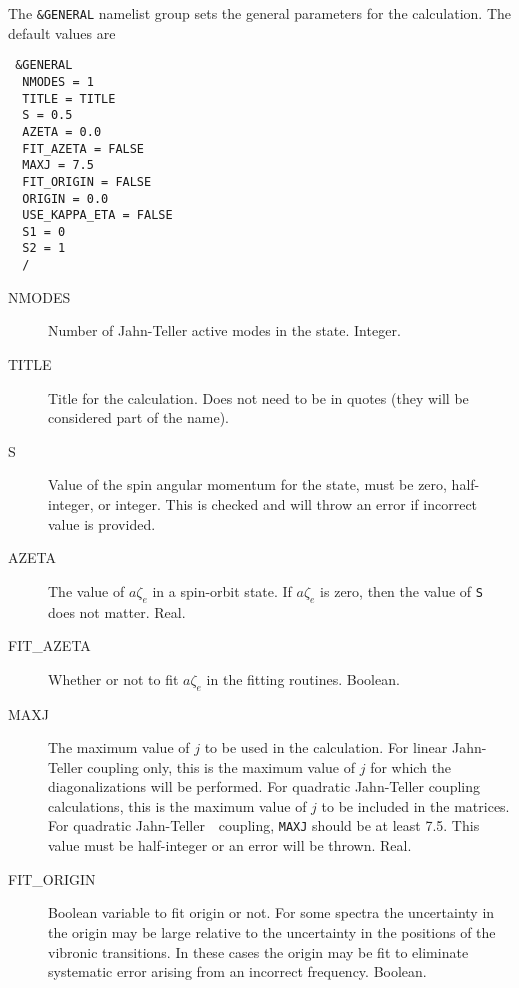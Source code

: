 \documentclass{article}
\newcommand{\JT}{Jahn-Teller\ }
\begin{document}
The {\tt \&GENERAL} namelist group sets the general parameters for the
calculation. The default values are

\begin{verbatim}
 &GENERAL 
  NMODES = 1
  TITLE = TITLE
  S = 0.5
  AZETA = 0.0
  FIT_AZETA = FALSE
  MAXJ = 7.5
  FIT_ORIGIN = FALSE
  ORIGIN = 0.0
  USE_KAPPA_ETA = FALSE
  S1 = 0
  S2 = 1
  /
\end{verbatim}

\begin{description}

\item[NMODES] Number of Jahn-Teller active modes in the state. Integer.

\item[TITLE] Title for the calculation. Does not need to be in quotes (they will be considered part of
  the name). 

\item[S] Value of the spin angular momentum for the state, must be
  zero, half-integer, or integer. This is checked and will throw an error if incorrect value is provided.

\item[AZETA] The value of $a\zeta _e$ in a spin-orbit state. If
  $a\zeta_e$ is zero, then the value of {\tt S} does not matter. Real.

\item[FIT\_AZETA] Whether or not to fit $a\zeta _e$ in the fitting
  routines. Boolean.


\item[MAXJ] The maximum value of $j$ to be used in the
  calculation. For linear Jahn-Teller coupling only, this is the
  maximum value of $j$ for which the diagonalizations will be
  performed. For quadratic Jahn-Teller coupling calculations, this is
  the maximum value of $j$ to be included in the matrices. For
  quadratic \JT\ coupling, {\tt MAXJ} should be at least 7.5. This value
  must be half-integer or an error will be thrown. Real.

  \item[FIT\_ORIGIN] Boolean variable to fit origin or not. For some spectra the uncertainty in the origin may be large relative to the uncertainty in the positions of the vibronic transitions. In these cases the origin may be fit to eliminate systematic error arising from an incorrect frequency. Boolean.
  

\end{description}
\end{document}
